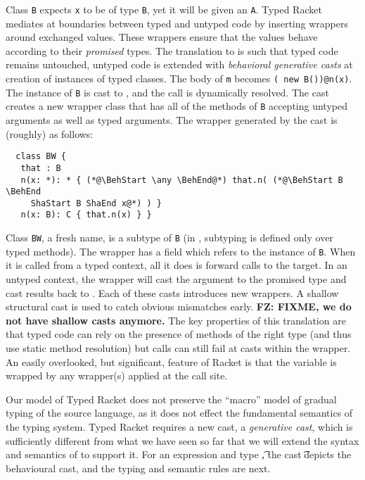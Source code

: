 \documentclass[acmlarge, anonymous, authordraft]{acmart}
\newcommand{\code}[1]{{\tt #1}\xspace}
\newcommand{\FZ}[1]{\textbf{FZ: #1}}
\begin{document}
\noindent Class \code B expects \code x to be of type \code B, yet it will
be given an \code A. Typed Racket mediates at boundaries between typed and
untyped code by inserting wrappers around exchanged values. These wrappers
ensure that the values behave according to their \emph{promised} types. The
translation to \kafka is such that typed code remains untouched, untyped
code is extended with \emph{behavioral generative casts} at creation of
instances of typed classes. The body of \code m becomes {\tt ({\BehStart
    \any \BehEnd}new B())@n(x)}.  The instance of \code B is cast to \any,
and the call is dynamically resolved. The cast creates a new wrapper class
that has all of the methods of \code B accepting untyped arguments as well
as typed arguments. The wrapper generated by the cast is (roughly) as
follows:

\begin{lstlisting}
  class BW {
   that : B
   n(x: *): * { (*@\BehStart \any \BehEnd@*) that.n( (*@\BehStart B \BehEnd
     ShaStart B ShaEnd x@*) ) }
   n(x: B): C { that.n(x) } }
\end{lstlisting}

\noindent Class \code{BW}, a fresh name, is a subtype of
\code B (in \kafka, subtyping is defined only over typed methods).  The
wrapper has a field \that which refers to the instance of \code B. When it
is called from a typed context, all it does is forward calls to the
target. In an untyped context, the wrapper will cast the argument to the
promised type and cast results back to \any. Each of these casts introduces
new wrappers. A shallow structural cast is used to catch obvious mismatches
early.   \FZ{FIXME, we do not have shallow casts anymore.}
 The key properties of this translation are that typed code can rely
on the presence of methods of the right type (and thus use static method
resolution) but calls can still fail at casts within the wrapper. An easily
overlooked, but significant, feature of Racket is that the \this variable is
wrapped by any wrapper(s) applied at the call site.


Our model of Typed Racket does not preserve the ``macro'' model of gradual
typing of the source language, as it does not effect the fundamental
semantics of the typing system.  Typed Racket requires a new cast, a
\emph{generative cast}, which is sufficiently different from what we have
seen so far that we will extend the syntax and semantics of \kafka to
support it.  For an expression \e and type \t, the cast \BehCast\t\e depicts
the behavioural cast, and the typing and semantic rules are next.
\end{document}
